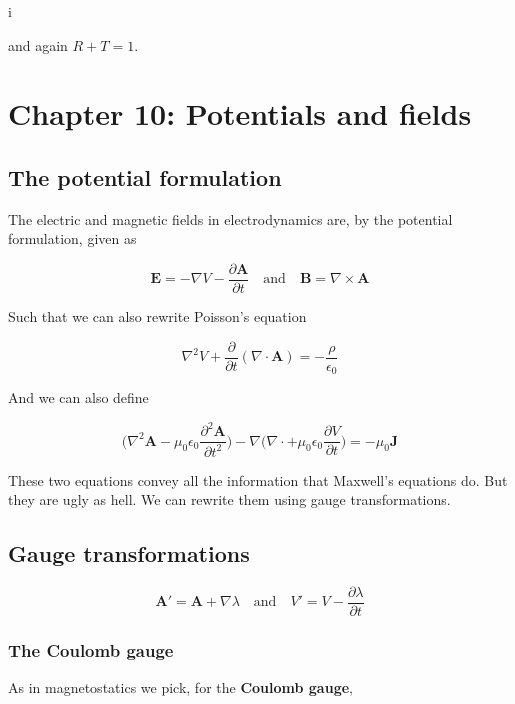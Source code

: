 i\documentclass[a4paper]{article}
\begin{document}
and again $R+T=1$.

\section{Chapter 10: Potentials and fields}

\subsection{The potential formulation}

The electric and magnetic fields in electrodynamics are, by the potential formulation, given as

\begin{equation*}
    \bm{E}=-\nabla V-\frac{\partial\bm{A}}{\partial t}\quad\text{and}\quad\bm{B}=\nabla\times\bm{A}
\end{equation*}

Such that we can also rewrite Poisson's equation

\begin{equation*}
    \nabla^2V+\frac{\partial}{\partial t}(\nabla\cdot\bm{A})=-\frac{\rho}{\epsilon_0}
\end{equation*}

And we can also define 

\begin{equation*}
    \bigg(\nabla^2\bm{A}-\mu_0\epsilon_0\frac{\partial^2\bm{A}}{\partial t^2}\bigg)-\nabla\bigg(\nabla\cdot+\mu_0\epsilon_0\frac{\partial V}{\partial t}\bigg)=-\mu_0\bm{J}
\end{equation*}

These two equations convey all the information that Maxwell's equations do. But they are ugly as hell. We can rewrite them using gauge transformations.

\subsection{Gauge transformations}

\begin{equation*}
    \bm{A}'=\bm{A}+\nabla\lambda\quad\text{and}\quad V'=V-\frac{\partial\lambda}{\partial t}
\end{equation*}

\subsubsection*{The Coulomb gauge}

As in magnetostatics we pick, for the \textbf{Coulomb gauge},
\end{document}
